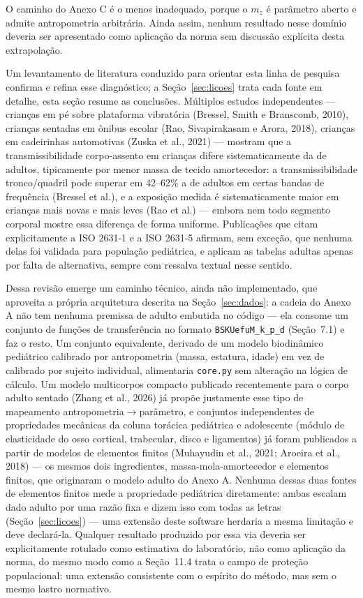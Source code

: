 \documentclass[11pt,a4paper]{article}
\newcommand{\code}[1]{\texttt{\small #1}}
\begin{document}
O caminho do Anexo C é o menos inadequado, porque o $m_z$ é parâmetro aberto e
admite antropometria arbitrária. Ainda assim, nenhum resultado nesse domínio
deveria ser apresentado como aplicação da norma sem discussão explícita desta
extrapolação.

Um levantamento de literatura conduzido para orientar esta linha de pesquisa
confirma e refina esse diagnóstico; a Seção~\ref{sec:licoes} trata cada fonte em
detalhe, esta seção resume as conclusões. Múltiplos estudos independentes ---
crianças em pé sobre plataforma vibratória (Bressel, Smith e Branscomb, 2010),
crianças sentadas em ônibus escolar (Rao, Sivapirakasam e Arora, 2018),
crianças em cadeirinhas automotivas (Zuska et al., 2021) --- mostram que a
transmissibilidade corpo-assento em crianças difere sistematicamente da de
adultos, tipicamente por menor massa de tecido amortecedor: a transmissibilidade
tronco/quadril pode superar em 42--62\% a de adultos em certas bandas de
frequência (Bressel et al.), e a exposição medida é sistematicamente maior em
crianças mais novas e mais leves (Rao et al.) --- embora nem todo segmento
corporal mostre essa diferença de forma uniforme. Publicações que citam
explicitamente a ISO 2631-1 e a ISO 2631-5 afirmam, sem exceção, que nenhuma
delas foi validada para população pediátrica, e aplicam as tabelas adultas
apenas por falta de alternativa, sempre com ressalva textual nesse sentido.

Dessa revisão emerge um caminho técnico, ainda não implementado, que aproveita
a própria arquitetura descrita na Seção~\ref{sec:dados}: a cadeia do Anexo A não
tem nenhuma premissa de adulto embutida no código --- ela consome um conjunto de
funções de transferência no formato \code{BSKUefuM\_k\_p\_d}
(Seção~7.1) e faz o resto. Um conjunto equivalente, derivado de um modelo
biodinâmico pediátrico calibrado por antropometria (massa, estatura, idade) em
vez de calibrado por sujeito individual, alimentaria \code{core.py} sem
alteração na lógica de cálculo. Um modelo multicorpos compacto publicado
recentemente para o corpo adulto sentado (Zhang et al., 2026) já propõe
justamente esse tipo de mapeamento antropometria$\to$parâmetro, e conjuntos
independentes de propriedades mecânicas da coluna torácica pediátrica e
adolescente (módulo de elasticidade do osso cortical, trabecular, disco e
ligamentos) já foram publicados a partir de modelos de elementos finitos
(Muhayudin et al., 2021; Aroeira et al., 2018) --- os mesmos dois ingredientes,
massa-mola-amortecedor e elementos finitos, que originaram o modelo adulto do
Anexo A. Nenhuma dessas duas fontes de elementos finitos mede a propriedade
pediátrica diretamente: ambas escalam dado adulto por uma razão fixa e dizem
isso com todas as letras (Seção~\ref{sec:licoes}) --- uma extensão deste
software herdaria a mesma limitação e deve declará-la. Qualquer resultado
produzido por essa via deveria ser explicitamente rotulado como estimativa do
laboratório, não como aplicação da norma, do mesmo modo como a Seção~11.4 trata
o campo de proteção populacional: uma extensão consistente com o espírito do
método, mas sem o mesmo lastro normativo.
\end{document}
